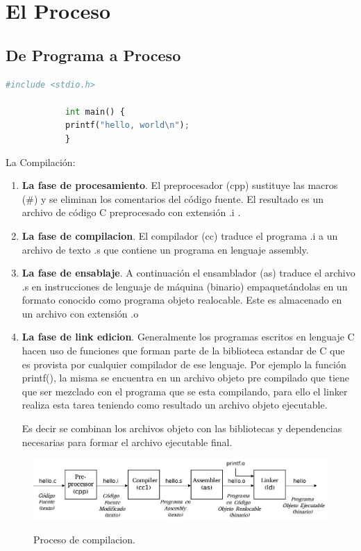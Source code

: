 \documentclass[../main.tex]{subfiles}
\begin{document}

\section{El Proceso}
    \subsection*{De Programa a Proceso}
        \begin{lstlisting}[language=Python, caption=hola mundo.]
            #include <stdio.h>

            int main() {
            printf("hello, world\n");
            }
        \end{lstlisting}
    
        La Compilación:
        \begin{enumerate}
            \item \textbf{La fase de procesamiento}. El preprocesador (cpp) sustituye las macros (\#) y se eliminan los comentarios del código fuente. El resultado es un archivo de código C preprocesado con extensión .i .
            \item \textbf{La fase de compilacion}. El compilador (cc) traduce el programa .i a un archivo de texto .s que contiene un programa en lenguaje assembly.
            \item \textbf{La fase de ensablaje}. A continuación el ensamblador (as) traduce el archivo .s en instrucciones de lenguaje de máquina (binario) empaquetándolas en un formato conocido como programa objeto realocable. Este es almacenado en un archivo con extensión .o
            \item \textbf{La fase de link edicion}. Generalmente los programas escritos en lenguaje C hacen uso de funciones que forman parte de la biblioteca estandar de C que es provista por cualquier compilador de ese lenguaje. Por ejemplo la función printf(), la misma se encuentra en un archivo objeto pre compilado que tiene que ser mezclado con el programa que se esta compilando, para ello el linker realiza esta tarea teniendo como resultado un archivo objeto ejecutable. 
            
            Es decir se combinan los archivos objeto con las bibliotecas y dependencias necesarias para formar el archivo ejecutable final.
        \end{enumerate}

        \begin{figure}[bh]
            \centering
            \includegraphics[scale=0.33]{../images/compilation.jpg}
            \label{fig:img1}
            \caption{Proceso de compilacion.}
        \end{figure}
\end{document}
